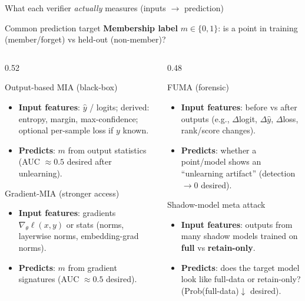 \documentclass[aspectratio=169, 11pt]{beamer}
\begin{document}
\begin{frame}{What each verifier \emph{actually} measures (inputs \(\rightarrow\) prediction)}
  \small
  \begin{block}{Common prediction target}
    \textbf{Membership label} \(m \in \{0,1\}\): is a point in training (member/forget) vs held-out (non-member)?
  \end{block}
  \vspace{0.4em}
  \begin{columns}[T]
    \begin{column}{0.52\textwidth}
      \begin{block}{Output-based MIA (black-box)}
        \begin{itemize}
          \item \textbf{Input features}: \(\hat{y}\) / logits; derived: entropy, margin, max-confidence; optional per-sample loss if \(y\) known.
          \item \textbf{Predicts}: \(m\) from output statistics (AUC \(\approx 0.5\) desired after unlearning).
        \end{itemize}
      \end{block}
      \begin{block}{Gradient-MIA (stronger access)}
        \begin{itemize}
          \item \textbf{Input features}: gradients \(\nabla_\theta \ell(x,y)\) or stats (norms, layerwise norms, embedding-grad norms).
          \item \textbf{Predicts}: \(m\) from gradient signatures (AUC \(\approx 0.5\) desired).
        \end{itemize}
      \end{block}
    \end{column}
    \begin{column}{0.48\textwidth}
      \begin{block}{FUMA (forensic)}
        \begin{itemize}
          \item \textbf{Input features}: before vs after outputs (e.g., \(\Delta\)logit, \(\Delta\hat{y}\), \(\Delta\)loss, rank/score changes).
          \item \textbf{Predicts}: whether a point/model shows an ``unlearning artifact'' (detection \(\to 0\) desired).
        \end{itemize}
      \end{block}
      \begin{block}{Shadow-model meta attack}
        \begin{itemize}
          \item \textbf{Input features}: outputs from many shadow models trained on \textbf{full} vs \textbf{retain-only}.
          \item \textbf{Predicts}: does the target model look like full-data or retain-only? (Prob(full-data)\(\downarrow\) desired).
        \end{itemize}
      \end{block}
    \end{column}
  \end{columns}
\end{frame}
\end{document}
